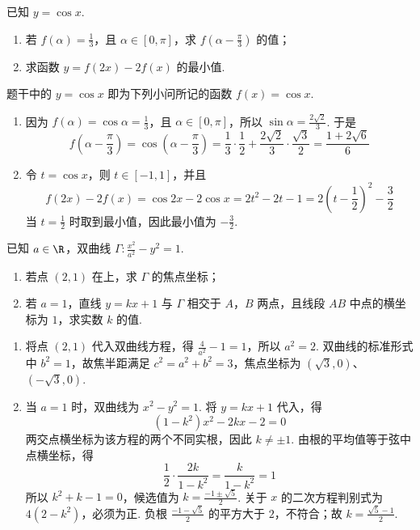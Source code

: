 \begin{problem}
已知 \(y=\cos x\).

\begin{enumerate}
\item 若 \(f(\alpha)=\frac13\)，且 \(\alpha\in[0,\pi]\)，求 \(f\!\left(\alpha-\frac\pi3\right)\) 的值；
\item 求函数 \(y=f(2x)-2f(x)\) 的最小值.
\end{enumerate}
\end{problem}

\begin{solution}
题干中的 \(y=\cos x\) 即为下列小问所记的函数 \(f(x)=\cos x\).
\begin{enumerate}
\item 因为 \(f(\alpha)=\cos\alpha=\frac13\)，且 \(\alpha\in[0,\pi]\)，所以 \(\sin\alpha=\frac{2\sqrt2}{3}\). 于是
\[
f\!\left(\alpha-\frac\pi3\right)=\cos\left(\alpha-\frac\pi3\right)=\frac13\cdot\frac12+\frac{2\sqrt2}{3}\cdot\frac{\sqrt3}{2}=\frac{1+2\sqrt6}{6}
\]
\item 令 \(t=\cos x\)，则 \(t\in[-1,1]\)，并且
\[
f(2x)-2f(x)=\cos2x-2\cos x=2t^2-2t-1=2\left(t-\frac12\right)^2-\frac32
\]
当 \(t=\frac12\) 时取到最小值，因此最小值为 \(-\frac32\).
\end{enumerate}
\end{solution}

\begin{problem}
已知 \(a\in\R\)，双曲线 \(\Gamma:\frac{x^2}{a^2}-y^2=1\).

\begin{enumerate}
\item 若点 \((2,1)\) 在上，求 \(\Gamma\) 的焦点坐标；
\item 若 \(a=1\)，直线 \(y=kx+1\) 与 \(\Gamma\) 相交于 \(A\)，\(B\) 两点，且线段 \(AB\) 中点的横坐标为 \(1\)，求实数 \(k\) 的值.
\end{enumerate}
\end{problem}

\begin{solution}
\begin{enumerate}
\item 将点 \((2,1)\) 代入双曲线方程，得 \(\frac4{a^2}-1=1\)，所以 \(a^2=2\). 双曲线的标准形式中 \(b^2=1\)，故焦半距满足 \(c^2=a^2+b^2=3\)，焦点坐标为 \((\sqrt3,0)\)、\((-\sqrt3,0)\).
\item 当 \(a=1\) 时，双曲线为 \(x^2-y^2=1\). 将 \(y=kx+1\) 代入，得
\[
(1-k^2)x^2-2kx-2=0
\]
两交点横坐标为该方程的两个不同实根，因此 \(k\ne\pm1\). 由根的平均值等于弦中点横坐标，得
\[
\frac12\cdot\frac{2k}{1-k^2}=\frac{k}{1-k^2}=1
\]
所以 \(k^2+k-1=0\)，候选值为 \(k=\frac{-1\pm\sqrt5}{2}\). 关于 \(x\) 的二次方程判别式为 \(4(2-k^2)\)，必须为正. 负根 \(\frac{-1-\sqrt5}{2}\) 的平方大于 \(2\)，不符合；故 \(k=\frac{\sqrt5-1}{2}\).
\end{enumerate}
\end{solution}

